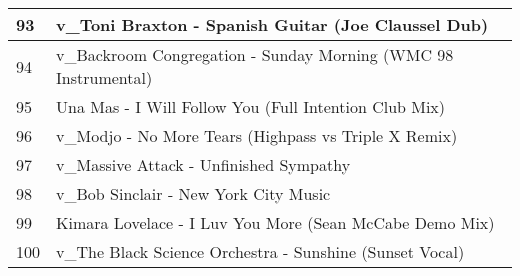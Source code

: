 \begin{appendices}
\begin{longtable}{| p{} | p{} |}
\hline
93 & v{\_}Toni Braxton - Spanish Guitar (Joe Claussel Dub)\\
\hline 
94 & v{\_}Backroom Congregation - Sunday Morning (WMC 98 Instrumental)\\
\hline
95 & Una Mas - I Will Follow You (Full Intention Club Mix)\\
\hline
96 & v{\_}Modjo - No More Tears (Highpass vs Triple X Remix)\\
\hline
97 & v{\_}Massive Attack - Unfinished Sympathy\\
\hline
98 & v{\_}Bob Sinclair - New York City Music\\
\hline
99 & Kimara Lovelace - I Luv You More (Sean McCabe Demo Mix)\\
\hline
100 & v{\_}The Black Science Orchestra - Sunshine (Sunset Vocal)\\
\hline
\end{longtable}

\end{appendices}
